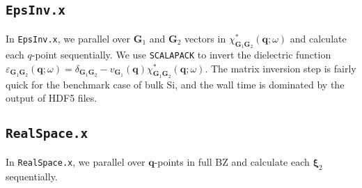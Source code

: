 \documentclass[11pt, oneside]{article}          %
\begin{document}
\subsection{{\tt EpsInv.x}}

In {\tt EpsInv.x}, we parallel over ${\bm G}_1$ and ${\bm G}_2$ vectors in $\chi^{*}_{{\bm G}_1 {\bm G}_2}({\bm q}; \omega)$ and calculate each $q$-point sequentially. We use {\tt SCALAPACK} to invert the dielectric function $\varepsilon_{{\bm G}_1 {\bm G}_2}({\bm q}; \omega) = \delta_{{\bm G}_1 {\bm G}_2} - v_{{\bm G}_1}({\bm q}) \chi^{*}_{{\bm G}_1 {\bm G}_2}({\bm q}; \omega)$. The matrix inversion step is fairly quick for the benchmark case of bulk Si, and the wall time is dominated by the output of HDF5 files.


\subsection{{\tt RealSpace.x}}

In {\tt RealSpace.x}, we parallel over ${\bm q}$-points in full BZ and calculate each ${\bm \xi}_2$ sequentially. 




\end{document}
